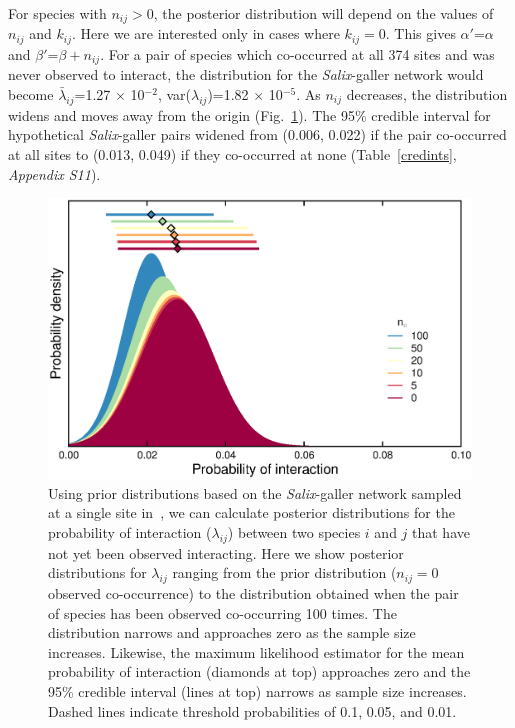 \documentclass[12pt]{article}
\begin{document}
      For species with $n_{ij}>0$, the posterior distribution will depend on the values of $n_{ij}$ and $k_{ij}$. Here we are interested only in cases where $k_{ij}=0$. This gives $\alpha'$=$\alpha$ and $\beta'$=$\beta + n_{ij}$. For a pair of species which co-occurred at all 374 sites and was never observed to interact, the distribution for the \emph{Salix}-galler network would become $\bar\lambda_{ij}$=1.27 $\times$ 10$^{-2}$, var($\lambda_{ij}$)=1.82 $\times$ 10$^{-5}$. As $n_{ij}$ decreases, the distribution widens and moves away from the origin (Fig.~\ref{Salix_pdfs}). The 95\% credible interval for hypothetical \emph{Salix}-galler pairs widened from (0.006, 0.022) if the pair co-occurred at all sites to (0.013, 0.049) if they co-occurred at none (Table~\ref{credints}, \emph{Appendix S11}). 

      \begin{figure}[h!]
        \caption{Using prior distributions based on the \emph{Salix}-galler network sampled at a single site in~\citet{Kopelke2017}, we can calculate posterior distributions for the probability of interaction ($\lambda_{ij}$) between two species $i$ and $j$ that have not yet been observed interacting. Here we show posterior distributions for $\lambda_{ij}$ ranging from the prior distribution ($n_{ij}=0$ observed co-occurrence) to the distribution obtained when the pair of species has been observed co-occurring 100 times. The distribution narrows and approaches zero as the sample size increases. Likewise, the maximum likelihood estimator for the mean probability of interaction (diamonds at top) approaches zero and the 95\% credible interval (lines at top) narrows as sample size increases. Dashed lines indicate threshold probabilities of 0.1, 0.05, and 0.01.}
        \label{Salix_pdfs}
        \begin{center}
        \includegraphics*[width=.9\textwidth]{figures/SG_pdfs_increasing_N_Zillis.eps}
        \end{center}
        \end{figure}
\end{document}
